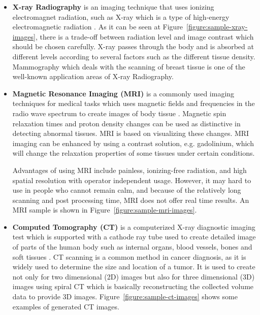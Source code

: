         \begin{itemize}

            \item \textbf{X-ray Radiography} is an imaging technique that uses ionizing electromagnet radiation, such as X-ray which is a type of high-energy electromagnetic radiation \cite{kasban2015comparative}.
                    As it can be seen at Figure~\ref{figure:sample-xray-images}, there is a trade-off between radiation level and image contrast which should be chosen carefully.
                    X-ray passes through the body and is absorbed at different levels according to several factors such as the different tissue density.
                    Mammography which deals with the scanning of breast tissue is one of the well-known application areas of X-ray Radiography.

                    

            \item \textbf{Magnetic Resonance Imaging (MRI)} is a commonly used imaging techniques for medical tasks
                    which uses magnetic fields and frequencies in the radio wave spectrum to create images of body tissue \cite{mehmood2013prioritization}.
                    Magnetic spin relaxation times and proton density changes can be used as distinctive in detecting abnormal tissues.
                    MRI is based on visualizing these changes.
                    MRI imaging can be enhanced by using a contrast solution, e.g. gadolinium, which will change the relaxation properties of some tissues under certain conditions.

                    

                    Advantages of using MRI include painless, ionizing-free radiation, and high spatial resolution with operator independent usage.
                    However, it may hard to use in people who cannot remain calm, and because of the relatively long scanning and post processing time, MRI does not offer real time results.
                    An MRI sample is shown in Figure~\ref{figure:sample-mri-images}.

            \item \textbf{Computed Tomography (CT)} is a computerized X-ray diagnostic imaging test which is supported with a cathode ray tube used to create detailed image of parts of the human body such as internal organs, blood vessels, bones and soft tissues \cite{Computed66online}.
                    CT scanning is a common method in cancer diagnosis, as it is widely used to determine the size and location of a tumor.
                    It is used to create not only for two dimensional (2D) images but also for three dimensional (3D) images using spiral CT which is basically reconstructing the collected volume data to provide 3D images.
                    Figure~\ref{figure:sample-ct-images} shows some examples of generated CT images.


\end{itemize}
